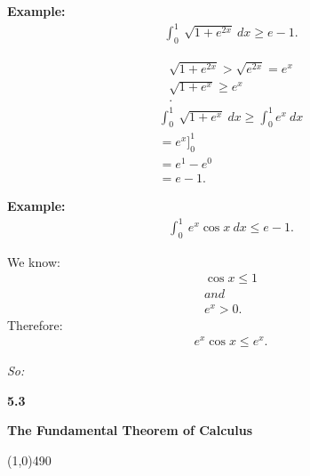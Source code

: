 \documentclass{report}
\begin{document}
\bigbreak \noindent 
\begin{mdframed}
  \textbf{Example: }
  \begin{align*}
    \int_{0}^{1}\ \sqrt{1+e^{2x}}\ dx \geq e-1
  .\end{align*}
\end{mdframed}

\begin{align*}
  \sqrt{1+e^{2x}} > \sqrt{e^{2x}} = e^{x} \\
  \sqrt{1+e^{x}} \geq e^{x} \\
.\end{align*}
\begin{align*}
  \int_{0}^{1}\ \sqrt{1+e^{x}}\ dx \geq \int_{0}^{1}e^{x}\ dx \\
= e^{x}\bigg]_{0}^{1} \\
= e^{1} - e^{0} \\
\boxed{= e-  1}
.\end{align*}

\bigbreak \noindent 
\begin{mdframed}
  \textbf{Example: }
  \begin{align*}
    \int_{0}^{1}\ e^{x}\cos{x}\ dx \leq e-1
  .\end{align*}
\end{mdframed}

\bigbreak \noindent \bigbreak \noindent
We know:
\begin{align*}
  \cos{x} \leq 1 \\
  and \\
  e^{x} > 0
.\end{align*}
\bigbreak \noindent \bigbreak \noindent
Therefore:
\begin{align*}
  e^{x}\cos{x} \leq e^{x}
.\end{align*}

\bigbreak \noindent
\textit{So:}

\pagebreak \bigbreak \noindent
\begin{Large}
  \begin{mdframed}
    \begin{center}
      \textbf{5.3}
    \end{center}
  \end{mdframed}
\end{Large}
\begin{Large}
  \begin{center}
    \textbf{The Fundamental Theorem of Calculus}
  \end{center}
\end{Large}
\line(1,0){490}
\end{document}
